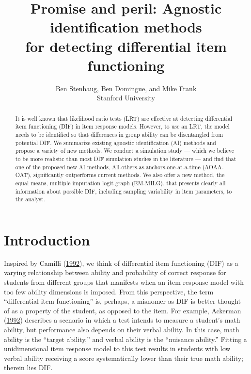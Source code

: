\documentclass[
  11pt,
]{article}
\title{Promise and peril: Agnostic identification methods\\
for detecting differential item functioning}
\subtitle{Ben Stenhaug, Ben Domingue, and Mike Frank\\
Stanford University}
\author{}
\date{\vspace{-2.5em}}
\begin{document}
\maketitle
\begin{abstract}
It is well known that likelihood ratio tests (LRT) are effective at detecting differential item functioning (DIF) in item response models. However, to use an LRT, the model needs to be identified so that differences in group ability can be disentangled from potential DIF. We summarize existing agnostic identification (AI) methods and propose a variety of new methods. We conduct a simulation study --- which we believe to be more realistic than most DIF simulation studies in the literature --- and find that one of the proposed new AI methods, All-others-as-anchors-one-at-a-time (AOAA-OAT), significantly outperforms current methods. We also offer a new method, the equal means, multiple imputation logit graph (EM-MILG), that presents clearly all information about possible DIF, including sampling variability in item parameters, to the analyst. \clearpage
\end{abstract}

{
\setcounter{tocdepth}{5}
\tableofcontents
}
\clearpage

\hypertarget{intro}{%
\section{Introduction}\label{intro}}

Inspired by Camilli (\protect\hyperlink{ref-camilli1992conceptual}{1992}), we think of differential item functioning (DIF) as a varying relationship between ability and probability of correct response for students from different groups that manifests when an item response model with too few ability dimensions is imposed. From this perspective, the term \enquote{differential item functioning} is, perhaps, a misnomer as DIF is better thought of as a property of the student, as opposed to the item. For example, Ackerman (\protect\hyperlink{ref-ackerman1992didactic}{1992}) describes a scenario in which a test intends to measure a student's math ability, but performance also depends on their verbal ability. In this case, math ability is the \enquote{target ability,} and verbal ability is the \enquote{nuisance ability.} Fitting a unidimensional item response model to this test results in students with low verbal ability receiving a score systematically lower than their true math ability; therein lies DIF.
\end{document}
